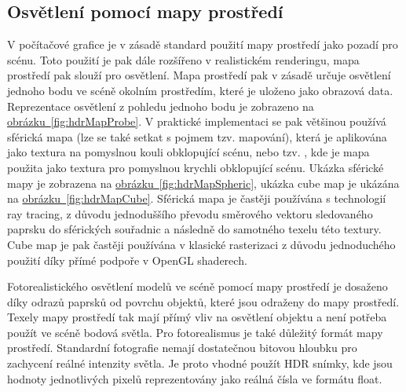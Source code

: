 \documentclass[czech,master]{diploma}
\begin{document}
\subsection{Osvětlení pomocí mapy prostředí}
V počítačové grafice je v zásadě standard použití mapy prostředí jako pozadí pro scénu. Toto použití je pak dále rozšířeno v realistickém renderingu, mapa prostředí pak slouží pro osvětlení. Mapa prostředí pak v zásadě určuje osvětlení jednoho bodu ve scéně okolním prostředím, které je uloženo jako obrazová data. Reprezentace osvětlení z pohledu jednoho bodu je zobrazeno na \hyperref[fig:hdrMapProbe]{obrázku~\ref{fig:hdrMapProbe}}. V praktické implementaci se pak většinou používá sférická mapa (lze se také setkat s pojmem tzv.  mapování), která je aplikována jako textura na pomyslnou kouli obklopující scénu, nebo tzv. , kde je mapa použita jako textura pro pomyslnou krychli obklopující scénu. Ukázka sférické mapy je zobrazena na \hyperref[fig:hdrMapSpheric]{obrázku~\ref{fig:hdrMapSpheric}}, ukázka cube map je ukázána na \hyperref[fig:hdrMapCube]{obrázku~\ref{fig:hdrMapCube}}. Sférická mapa je častěji používána s technologií ray tracing, z důvodu jednoduššího převodu směrového vektoru sledovaného paprsku do sférických souřadnic a následně do samotného texelu této textury. Cube map je pak častěji používána v klasické rasterizaci z důvodu jednoduchého použití díky přímé podpoře v OpenGL shaderech.\par
Fotorealistického osvětlení modelů ve scéně pomocí mapy prostředí je dosaženo díky odrazů paprsků od povrchu objektů, které jsou odraženy do mapy prostředí. Texely mapy prostředí tak mají přímý vliv na osvětlení objektu a není potřeba použít ve scéně bodová světla. Pro fotorealismus je také důležitý formát mapy prostředí. Standardní fotografie nemají dostatečnou bitovou hloubku pro zachycení reálné intenzity světla. Je proto vhodné použít HDR snímky, kde jsou hodnoty jednotlivých pixelů reprezentovány jako reálná čísla ve formátu float.
\end{document}
